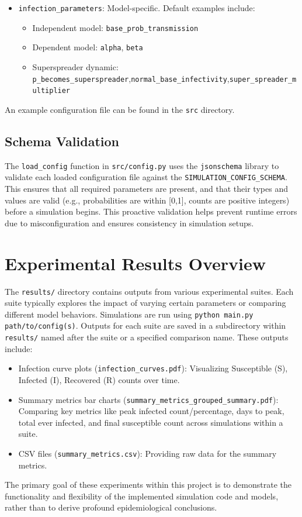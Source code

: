 \documentclass[12pt]{article}
\begin{document}
\begin{itemize}
\begin{itemize}
      \item \texttt{infection\_parameters}: Model-specific. Default examples include:
          \begin{itemize}
              \item Independent model: \texttt{base\_prob\_trans\-mis\-sion}
              \item Dependent model: \texttt{alpha}, \texttt{beta}
              \item Superspreader dynamic: \texttt{p\_becomes\_super\-spread\-er},\allowbreak \texttt{normal\_base\_in\-fec\-tiv\-ity},\allowbreak \texttt{super\_spread\-er\_multi\-pli\-er}
          \end{itemize}
    \end{itemize}
  \end{itemize}
An example configuration file can be found in the \texttt{src} directory.

\subsection{Schema Validation}
The \texttt{load\_config} function in \texttt{src/config.py} uses the \texttt{jsonschema} library to validate each loaded configuration file against the \texttt{SIMULATION\_CONFIG\_SCHEMA}. This ensures that all required parameters are present, and that their types and values are valid (e.g., probabilities are within [0,1], counts are positive integers) before a simulation begins. This proactive validation helps prevent runtime errors due to misconfiguration and ensures consistency in simulation setups.

\section{Experimental Results Overview}
The \texttt{results/} directory contains outputs from various experimental suites. Each suite typically explores the impact of varying certain parameters or comparing different model behaviors. Simulations are run using \texttt{python main.py path/to/config(s)}. Outputs for each suite are saved in a subdirectory within \texttt{results/} named after the suite or a specified comparison name. These outputs include: \begin{itemize} \item Infection curve plots (\texttt{infection\_curves.pdf}): Visualizing Susceptible (S), Infected (I), Recovered (R) counts over time. \item Summary metrics bar charts (\texttt{summary\_metrics\_grouped\_summary.pdf}): Comparing key metrics like peak infected count/percentage, days to peak, total ever infected, and final susceptible count across simulations within a suite. \item CSV files (\texttt{summary\_metrics.csv}): Providing raw data for the summary metrics. \end{itemize} The primary goal of these experiments within this project is to demonstrate the functionality and flexibility of the implemented simulation code and models, rather than to derive profound epidemiological conclusions.
\end{document}
